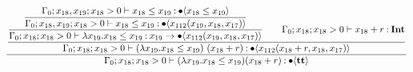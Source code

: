 \documentclass{article}
\begin{document}
\begin{align*}
\dfrac{
\dfrac{
    \dfrac{
        \dfrac{
    \Gamma_0; x_{18}, x_{19}; x_{18} > 0 \vdash
    x_{18} \leq x_{19}
    \mathbin{:} \bullet \langle x_{18} \leq x_{19} \rangle
    }{
    \Gamma_0; x_{18}, x_{19}; x_{18} > 0 \vdash
    x_{18} \leq x_{19} \mathbin{:} \bullet \langle x_{112}(x_{19}, x_{18}, x_{17})  \rangle
    }
    }{
    \Gamma_0; x_{18}; x_{18} > 0 \vdash
    \lambda x_{19}. x_{18} \leq x_{19} \mathbin{:} x_{19} \to \bullet \langle x_{112}(x_{19}, x_{18}, x_{17})  \rangle
    }
    \qquad
    \Gamma_0; x_{18}; x_{18} > 0 \vdash
    x_{18} + r \mathbin{:} \textbf{Int}
} {
    \Gamma_0; x_{18}; x_{18} > 0 \vdash
    (\lambda x_{19}. x_{18} \leq x_{19})\ (x_{18} + r)
    \mathbin{:} \bullet \langle x_{112}(x_{18} + r, x_{18}, x_{17}) \rangle
}
    }{
    \Gamma_0; x_{18}; x_{18} > 0 \vdash
    (\lambda x_{19}. x_{18} \leq x_{19}) (x_{18} + r)
    \mathbin{:} \bullet \langle \textbf{tt} \rangle
    }
\end{align*}
%
%
%
%
%
%
%
%
%
%
%
%
\end{document}
